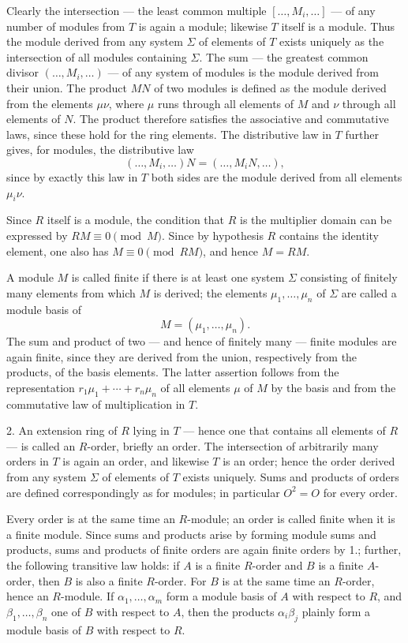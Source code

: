 \documentclass[11pt]{article}
\begin{document}
Clearly the intersection — the least common multiple $[\ldots,M_i,\ldots]$ — of
any number of modules from $T$ is again a module; likewise $T$ itself is a module.
Thus the module derived from any system $\Sigma$ of elements of $T$ exists uniquely
as the intersection of all modules containing $\Sigma$. The sum — the greatest
common divisor $(\ldots,M_i,\ldots)$ — of any system of modules is the module
derived from their union. The product $MN$ of two modules is defined as the
module derived from the elements $\mu\nu$, where $\mu$ runs through all elements
of $M$ and $\nu$ through all elements of $N$. The product therefore satisfies the
associative and commutative laws, since these hold for the ring elements. The
distributive law in $T$ further gives, for modules, the distributive law
\[
        (\ldots,M_i,\ldots)N=(\ldots,M_iN,\ldots),
\]
since by exactly this law in $T$ both sides are the module derived from all elements
$\mu_i\nu$.

Since $R$ itself is a module, the condition that $R$ is the multiplier domain can
be expressed by $RM\equiv0\pmod M$. Since by hypothesis $R$ contains the identity
element, one also has $M\equiv0\pmod{RM}$, and hence $M=RM$.

A module $M$ is called finite if there is at least one system $\Sigma$ consisting
of finitely many elements from which $M$ is derived; the elements
$\mu_1,\ldots,\mu_n$ of $\Sigma$ are called a module basis of
\[
        M=(\mu_1,\ldots,\mu_n).
\]
The sum and product of two — and hence of finitely many — finite modules are
again finite, since they are derived from the union, respectively from the products,
of the basis elements. The latter assertion follows from the representation
$r_1\mu_1+\cdots+r_n\mu_n$ of all elements $\mu$ of $M$ by the basis and from
the commutative law of multiplication in $T$.

2. An extension ring of $R$ lying in $T$ — hence one that contains all elements
of $R$ — is called an $R$-order, briefly an order. The intersection of arbitrarily
many orders in $T$ is again an order, and likewise $T$ is an order; hence the order
derived from any system $\Sigma$ of elements of $T$ exists uniquely. Sums and
products of orders are defined correspondingly as for modules; in particular
$O^2=O$ for every order.

Every order is at the same time an $R$-module; an order is called finite when it is
a finite module. Since sums and products arise by forming module sums and products,
sums and products of finite orders are again finite orders by 1.; further, the following
transitive law holds: if $A$ is a finite $R$-order and $B$ is a finite $A$-order, then
$B$ is also a finite $R$-order. For $B$ is at the same time an $R$-order, hence an
$R$-module. If $\alpha_1,\ldots,\alpha_m$ form a module basis of $A$ with respect
to $R$, and $\beta_1,\ldots,\beta_n$ one of $B$ with respect to $A$, then the
products $\alpha_i\beta_j$ plainly form a module basis of $B$ with respect to $R$.
\end{document}
